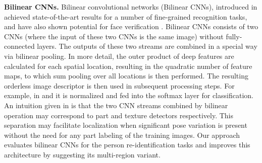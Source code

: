 \textbf{Bilinear CNNs.} Bilinear convolutional networks (Bilinear CNNs), introduced in \cite{lin2015bilinear} achieved state-of-the-art results for a number of fine-grained recognition tasks, and have also shown potential for face verification \cite{roychowdhury2015face}. Bilinear CNNs consists of two CNNs (where the input of these two CNNs is the same image) without fully-connected layers. The outputs of these two streams are combined in a special way via bilinear pooling. In more detail, the outer product of deep features are calculated for each spatial location, resulting in the quadratic number of feature maps, to which sum pooling over all locations is then performed. The resulting orderless image descriptor is then used in subsequent processing steps. For example, in \cite{lin2015bilinear} and \cite{roychowdhury2015face} it is normalized and fed into the softmax layer for classification. An intuition given in \cite{lin2015bilinear} is that the two CNN streams combined by bilinear operation may correspond to part and texture detectors respectively. This separation may facilitate localization when significant pose variation is present without the need for any part labeling of the training images. Our approach evaluates bilinear CNNs for the person re-identification tasks and improves this architecture by suggesting its multi-region variant.

